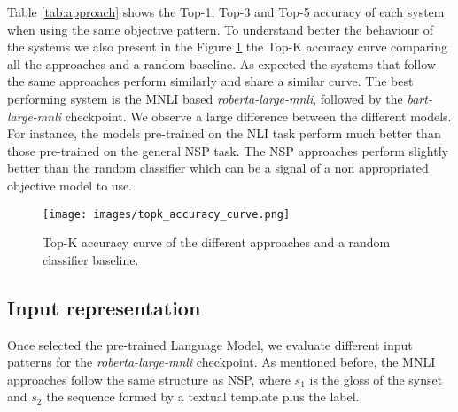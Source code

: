 \documentclass[11pt]{article}
\begin{document}
Table \ref{tab:approach} shows the Top-1, Top-3 and Top-5 accuracy of each system when using the same objective pattern. To understand better the behaviour of the systems we also present in the Figure \ref{fig:topk_curve} the Top-K accuracy curve comparing all the approaches and a random baseline. As expected the systems that follow the same approaches perform similarly and share a similar curve. The best performing system is the MNLI based \textit{roberta-large-mnli}, followed by the \textit{bart-large-mnli} checkpoint. We observe a large difference between the different models. For instance, the models pre-trained on the NLI task perform much better than those pre-trained on the general NSP task.
The NSP approaches perform slightly better than the random classifier which can be a signal of a non appropriated objective model to use. 



\begin{figure}[!t]
    \centering
    \texttt{[image: images/topk\_accuracy\_curve.png]}
    \caption{Top-K accuracy curve of the different approaches and a random classifier baseline.}
    \label{fig:topk_curve}
\end{figure}

\subsection{Input representation}

Once selected the pre-trained Language Model, we evaluate different input patterns for the \textit{roberta-large-mnli} checkpoint. As mentioned before, the MNLI approaches follow the same structure as NSP, where $s_1$ is the gloss of the synset and $s_2$ the sequence formed by a textual template plus the label.
\end{document}
